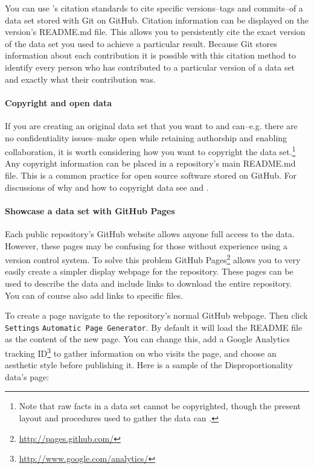\documentclass[twocolumn]{article}\usepackage{graphicx, color}
\begin{document}
You can use \citeauthor{Altman2007}'s citation standards to cite specific versions--tags and commits--of a data set stored with Git on GitHub. Citation information can be displayed on the version's README.md file. This allows you to persistently cite the exact version of the data set you used to achieve a particular result. Because Git stores information about each contribution it is possible with this citation method to identify every person who has contributed to a particular version of a data set and exactly what their contribution was.

\paragraph{Copyright and open data}

If you are creating an original data set that you want to and can--e.g. there are no confidentiality issues--make open while retaining authorship and enabling collaboration, it is worth considering how you want to copyright the data set.\footnote{Note that raw facts in a data set cannot be copyrighted, though the present layout and procedures used to gather the data can \citep[39]{Stodden2009}.} Any copyright information can be placed in a repository's main README.md file. This is a common practice for open source software stored on GitHub. For discussions of why and how to copyright data see \cite{Stodden2009} and \cite{CreativeCommons}.

\paragraph{Showcase a data set with GitHub Pages}

Each public repository's GitHub website allows anyone full access to the data. However, these pages may be confusing for those without experience using a version control system. To solve this problem GitHub Pages\footnote{\url{http://pages.github.com/}} allows you to very easily create a simpler display webpage for the repository. These pages can be used to describe the data and include links to download the entire repository. You can of course also add links to specific files.

To create a page navigate to the repository's normal GitHub webpage. Then click \texttt{Settings} \textrightarrow{} \texttt{Automatic Page Generator}. By default it will load the README file as the content of the new page. You can change this, add a Google Analytics tracking ID\footnote{\url{http://www.google.com/analytics/}} to gather information on who visits the page, and choose an aesthetic style before publishing it. Here is a sample of the Disproportionality data's page:
\end{document}
